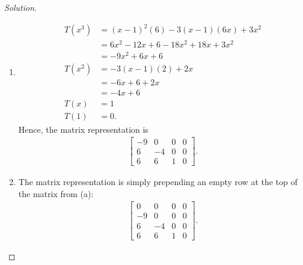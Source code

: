 \documentclass{article}
\begin{document}
\begin{proof}[Solution]\indent
    \begin{enumerate}[label=(\alph*)]
        \item
        \begin{align*}
            T(x^3) & = (x-1)^2(6) - 3(x-1)(6x) + 3x^2 \\
            & = 6x^2 - 12x + 6 - 18x^2 + 18x + 3x^2 \\
            & = -9x^2 + 6x + 6 \\
            T(x^2) & = -3(x-1)(2) + 2x \\
            & = -6x + 6 + 2x \\
            & = -4x + 6 \\
            T(x) & = 1 \\
            T(1) & = 0.
        \end{align*}
        Hence, the matrix representation is 
        \begin{align*}
            \begin{bmatrix}
                -9 & 0 & 0 & 0 \\
                6 & -4 & 0 & 0 \\
                6 & 6 & 1 & 0
            \end{bmatrix}.
        \end{align*}

        \item 
        The matrix representation is simply prepending an empty row at the top of the matrix from 
        (a):
        \begin{align*}
            \begin{bmatrix}
                0 & 0 & 0 & 0 \\
                -9 & 0 & 0 & 0 \\
                6 & -4 & 0 & 0 \\
                6 & 6 & 1 & 0
            \end{bmatrix}.
        \end{align*}


\end{enumerate}
\end{proof}
\end{document}

